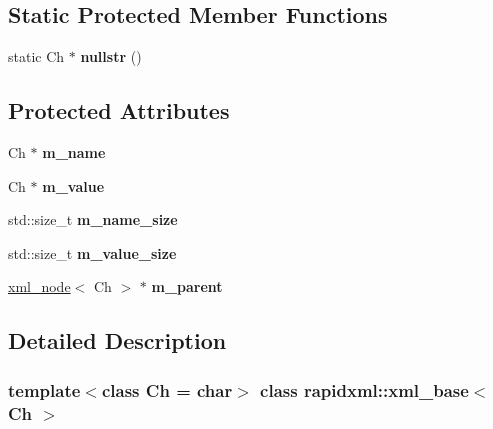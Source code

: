 \subsection*{Static Protected Member Functions}
\begin{DoxyCompactItemize}
\item 
\mbox{\label{classrapidxml_1_1xml__base_ad96ff6b1e41dab3ff60b9bc4df769a75}} 
static Ch $\ast$ {\bfseries nullstr} ()
\end{DoxyCompactItemize}
\subsection*{Protected Attributes}
\begin{DoxyCompactItemize}
\item 
\mbox{\label{classrapidxml_1_1xml__base_afd9851ed43e14619db0d7075ef8e9e8a}} 
Ch $\ast$ {\bfseries m\+\_\+name}
\item 
\mbox{\label{classrapidxml_1_1xml__base_a278a1ea63b0b70219b946cec47fa00ea}} 
Ch $\ast$ {\bfseries m\+\_\+value}
\item 
\mbox{\label{classrapidxml_1_1xml__base_a5a8c76a7274b4180213796422c4df76f}} 
std\+::size\+\_\+t {\bfseries m\+\_\+name\+\_\+size}
\item 
\mbox{\label{classrapidxml_1_1xml__base_aa3a49d8ceddb8a8d7edb773a2226b89c}} 
std\+::size\+\_\+t {\bfseries m\+\_\+value\+\_\+size}
\item 
\mbox{\label{classrapidxml_1_1xml__base_a90d5f660f078f66563fd7b2d8387ccb0}} 
\mbox{\hyperlink{classrapidxml_1_1xml__node}{xml\+\_\+node}}$<$ Ch $>$ $\ast$ {\bfseries m\+\_\+parent}
\end{DoxyCompactItemize}


\subsection{Detailed Description}
\subsubsection*{template$<$class Ch = char$>$\newline
class rapidxml\+::xml\+\_\+base$<$ Ch $>$}

